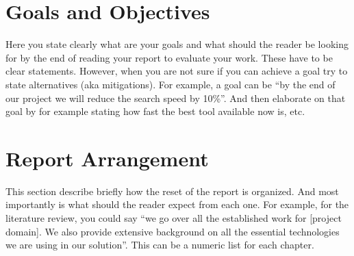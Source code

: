 \section{Goals and Objectives}
\label{sec:goals_and_objectives}

Here you state clearly what are your goals and what should the reader be looking for by the end of reading your report to evaluate your work. These have to be clear statements. However, when you are not sure if you can achieve a goal try to state alternatives (aka mitigations). For example, a goal can be ``by the end of our project we will reduce the search speed by 10\%''. And then elaborate on that goal by for example stating how fast the best tool available now is, etc.

\section{Report Arrangement}
\label{sec:report_arrangement}

This section describe briefly how the reset of the report is organized. And most importantly is what should the reader expect from each one. For example, for the literature review, you could say ``we go over all the established work for [project domain]. We also provide extensive background on all the essential technologies we are using in our solution''. This can be a numeric list for each chapter. 
